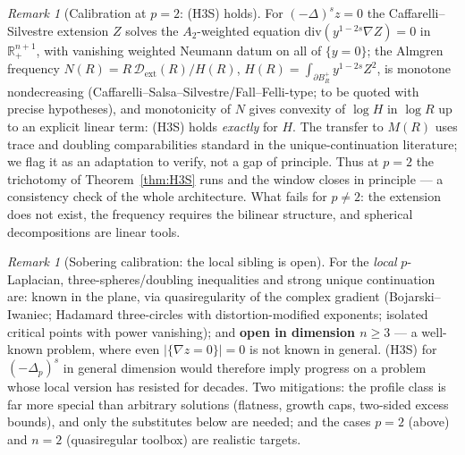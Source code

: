 \documentclass[11pt]{amsart}
\theoremstyle{plain}
\theoremstyle{definition}
\theoremstyle{remark}
\newtheorem{remark}[theorem]{Remark}
\newcommand{\R}{\mathbb{R}}
\begin{document}
\begin{remark}[Calibration at $p=2$: \textnormal{(H3S)} holds]
\label{rem:p2calib}
For $(-\Delta)^sz=0$ the Caffarelli--Silvestre extension $Z$ solves the
$A_2$-weighted equation $\mathrm{div}(y^{1-2s}\nabla Z)=0$ in
$\R^{n+1}_+$, with vanishing weighted Neumann datum on all of
$\{y=0\}$; the Almgren frequency
$N(R)=R\,\mathcal D_{\mathrm{ext}}(R)/H(R)$,
$H(R)=\int_{\partial B_R^+}y^{1-2s}Z^2$, is monotone nondecreasing
\textnormal{(}Caffarelli--Salsa--Silvestre/Fall--Felli-type; to be quoted
with precise hypotheses\textnormal{)}, and monotonicity of $N$ gives
convexity of $\log H$ in $\log R$ up to an explicit linear term:
\textnormal{(H3S)} holds \emph{exactly} for $H$. The transfer to $M(R)$
uses trace and doubling comparabilities standard in the
unique-continuation literature; we flag it as an adaptation to verify, not
a gap of principle. Thus at $p=2$ the trichotomy of
Theorem~\ref{thm:H3S} runs and the window closes in principle --- a
consistency check of the whole architecture. What fails for $p\neq2$: the
extension does not exist, the frequency requires the bilinear structure,
and spherical decompositions are linear tools.
\end{remark}

\begin{remark}[Sobering calibration: the local sibling is open]
\label{rem:localcalib}
For the \emph{local} $p$-Laplacian, three-spheres/doubling inequalities
and strong unique continuation are: known in the plane, via
quasiregularity of the complex gradient
\textnormal{(}Bojarski--Iwaniec; Hadamard three-circles with
distortion-modified exponents; isolated critical points with power
vanishing\textnormal{)}; and \textbf{open in dimension $n\ge3$} --- a
well-known problem, where even $|\{\nabla z=0\}|=0$ is not known in
general. \textnormal{(H3S)} for $(-\Delta_p)^s$ in general dimension would
therefore imply progress on a problem whose local version has resisted for
decades. Two mitigations: the profile class is far more special than
arbitrary solutions \textnormal{(}flatness, growth caps, two-sided excess
bounds\textnormal{)}, and only the substitutes below are needed; and the
cases $p=2$ \textnormal{(}above\textnormal{)} and $n=2$
\textnormal{(}quasiregular toolbox\textnormal{)} are realistic targets.
\end{remark}
\end{document}
